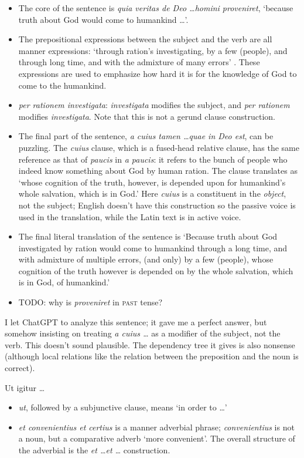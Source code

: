 \documentclass[a4paper, 12pt]{article}
\newcommand{\form}[1]{\emph{#1}}
\newcommand*{\category}[1]{\textsc{#1}}
\newcommand{\translate}[1]{`#1'}
\begin{document}
\begin{itemize}
    \item The core of the sentence is 
    \form{quia veritas de Deo \dots homini proveniret}, 
    \translate{because truth about God would come to humankind \dots}.
    \item The prepositional expressions between the subject 
    and the verb are all manner expressions:
    \translate{through ration's investigating, by a few (people), 
    and through long time, and with the admixture of many errors} .
    These expressions are used to emphasize how hard it is 
    for the knowledge of God to come to the humankind.
    \item \form{per rationem investigata}: 
    \form{investigata} modifies the subject, 
    and \form{per rationem} modifies \form{investigata}.
    Note that this is not a gerund clause construction.
    \item The final part of the sentence, 
    \form{a cuius tamen \dots quae in Deo est}, 
    can be puzzling.
    The \form{cuius} clause, which is a fused-head relative clause, 
    has the same reference as that of \form{paucis} in \form{a paucis}: 
    it refers to the bunch of people 
    who indeed know something about God by human ration.
    The clause translates as 
    \translate{whose cognition of the truth, however, is depended upon 
    for humankind's whole salvation, which is in God.}
    Here \form{cuius} is a constituent in the \emph{object}, not the subject; 
    English doesn't have this construction 
    so the passive voice is used in the translation, 
    while the Latin text is in active voice.
    \item The final literal translation of the sentence is 
    \translate{Because truth about God investigated by ration 
    would come to humankind through a long time, 
    and with admixture of multiple errors,
    (and only) by a few (people),
    whose cognition of the truth however is depended on by the whole salvation, 
    which is in God, of humankind.}
    \item TODO: why is \form{proveniret} in \category{past} tense?
\end{itemize}

I let ChatGPT to analyze this sentence; 
it gave me a perfect answer, 
but somehow insisting on treating \form{a cuius \dots}
as a modifier of the subject, not the verb.
This doesn't sound plausible.
The dependency tree it gives is also nonsense
(although local relations like the relation between the preposition and the noun is correct).

\begin{exe}
    \ex Ut igitur \dots
\end{exe}

\begin{itemize}
    \item \form{ut}, followed by a subjunctive clause, means \translate{in order to \dots}
    \item \form{et convenientius et certius} is a manner adverbial phrase;  
    \form{convenientius} is not a noun, but a comparative adverb \translate{more convenient}.
    The overall structure of the adverbial is the \form{et \dots et \dots} construction.
\end{itemize}
\end{document}
